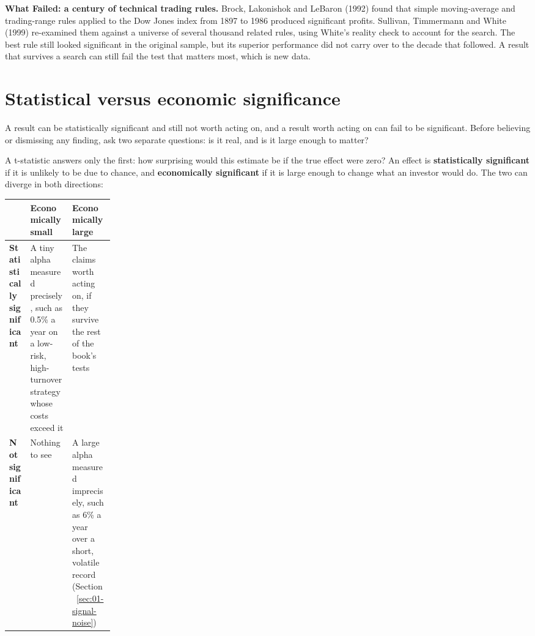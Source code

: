 \begin{callout}
\textbf{What Failed: a century of technical trading rules.} Brock, Lakonishok and LeBaron (1992) found that simple moving-average and trading-range rules applied to the Dow Jones index from 1897 to 1986 produced significant profits. Sullivan, Timmermann and White (1999) re-examined them against a universe of several thousand related rules, using White's reality check to account for the search. The best rule still looked significant in the original sample, but its superior performance did not carry over to the decade that followed. A result that survives a search can still fail the test that matters most, which is new data.
\end{callout}

\section{Statistical versus economic significance}
\label{sec:03-economic}

A result can be statistically significant and still not worth acting on, and a
result worth acting on can fail to be significant. Before believing or
dismissing any finding, ask two separate questions: is it real, and is it
large enough to matter?

A t-statistic answers only the first: how surprising would this estimate be if
the true effect were zero? An effect is \textbf{statistically significant} if it
is unlikely to be due to chance, and \textbf{economically significant} if it is
large enough to change what an investor would do. The two can diverge in both
directions:

\begin{center}
\small
\begin{tabularx}{0.9\linewidth}{@{}>{\raggedright\arraybackslash}p{0.20\linewidth}>{\raggedright\arraybackslash}X>{\raggedright\arraybackslash}X@{}}
\toprule
 & Economically small & Economically large \\
\midrule
\textbf{Statistically significant} & A tiny alpha measured precisely, such as 0.5\% a year on a low-risk, high-turnover strategy whose costs exceed it & The claims worth acting on, if they survive the rest of the book's tests \\
\textbf{Not significant} & Nothing to see & A large alpha measured imprecisely, such as 6\% a year over a short, volatile record (Section~\ref{sec:01-signal-noise}) \\
\bottomrule
\end{tabularx}
\end{center}

